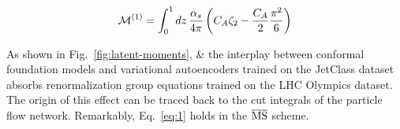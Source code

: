 \begin{equation}
  \mathcal{M}^{(1)} = \int_0^1 dz \, \frac{\alpha_s}{4\pi} \left( C_A \zeta_{2} - \frac{C_A}{2} \frac{\pi^2}{6} \right)
  \label{eq:1}
\end{equation}

As shown in Fig.~\ref{fig:latent-moments}, & the interplay between
conformal foundation models and variational autoencoders trained on the
JetClass dataset absorbs renormalization group equations trained on the
LHC Olympics dataset. The origin of this effect can be traced back to
the cut integrals of the particle flow network. Remarkably,
Eq.~\eqref{eq:1} holds in the $\overline{\rm MS}$ scheme.

